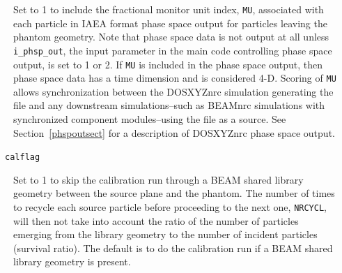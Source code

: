 \documentclass[12pt,twoside]{article}      %
\newcommand{\indexm}[1]{\index{#1}}
\begin{document}
\begin{description}
Set to 1 to include the fractional monitor unit index, {\tt MU}, associated with each particle in IAEA format phase
space output for particles leaving the phantom geometry.  Note that phase space data is not output at all
unless
\indexm{i\_phsp\_out}
{\tt i\_phsp\_out}, the input parameter in the main code controlling phase space output, is set to 1 or 2.
If {\tt MU} is included in the phase space output, then phase space data has a time dimension and is considered 4-D.
Scoring of {\tt MU} allows synchronization between the DOSXYZnrc simulation generating the file and any
downstream simulations--such as BEAMnrc simulations with synchronized component modules--using the file as
a source. See Section~\ref{phspoutsect} for a description of DOSXYZnrc phase space output.
\item [~~~~{\tt calflag}]
\indexm{calflag}
\indexm{NRCYCL}
Set to 1 to skip the calibration run through a BEAM shared library geometry between the source plane and
the phantom. The number of times to recycle each source particle before proceeding to the next one,
{\tt NRCYCL}, will then not take into account the ratio of the number of particles emerging from the
library geometry to the number of incident particles (survival ratio).  The default is to do the calibration run if a BEAM shared library geometry is present.
\end{description}
\end{document}
